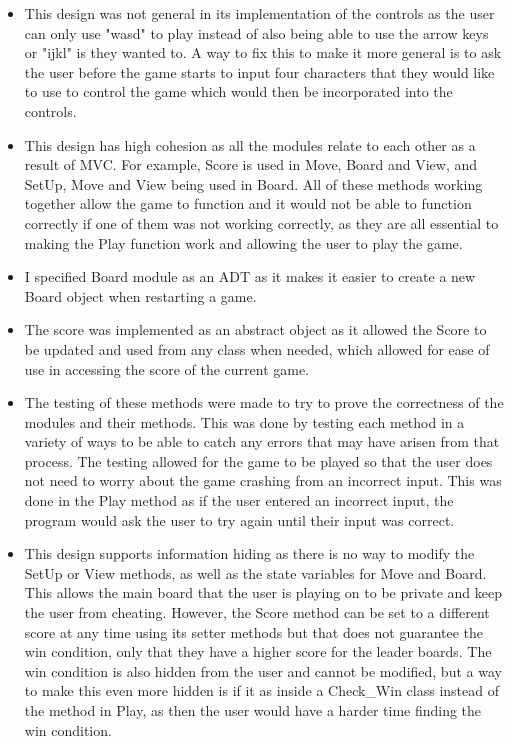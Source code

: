 \documentclass[12pt]{article}
\begin{document}
\begin{itemize}
\item This design was not general in its implementation of the controls as the user can only use "wasd" to play instead of also being able to use the arrow keys or "ijkl" is they wanted to. A way to fix this to make it more general is to ask the user before the game starts to input four characters that they would like to use to control the game which would then be incorporated into the controls. 

\item This design has high cohesion as all the modules relate to each other as a result of MVC. For example, Score is used in Move, Board and View, and SetUp, Move and View being used in Board. All of these methods working together allow the game to function and it would not be able to function correctly if one of them was not working correctly, as they are all essential to making the Play function work and allowing the user to play the game. 

\item I specified Board module as an ADT as it makes it easier to create a new Board object when restarting a game. 

\item The score was implemented as an abstract object as it allowed the Score to be updated and used from any class when 
needed, which allowed for ease of use in accessing the score of the current game. 

\item The testing of these methods were made to try to prove the correctness of the modules and their methods. This was done by testing each method in a variety of ways to be able to catch any errors that may have arisen from that process. The testing allowed for the game to be played so that the user does not need to worry about the game crashing from an incorrect input. This was done in the Play method as if the user entered an incorrect input, the program would ask the user to try again until their input was correct. 

\item This design supports information hiding as there is no way to modify the SetUp or View methods, as well as the state variables for Move and Board. This allows the main board that the user is playing on to be private and keep the user from cheating. However, the Score method can be set to a different score at any time using its setter methods but that does not guarantee the win condition, only that they have a higher score for the leader boards. The win condition is also hidden from the user and cannot be modified, but a way to make this even more hidden is if it as inside a Check\_Win class instead of the method in Play, as then the user would have a harder time finding the win condition. 

\end{itemize}
\end{document}
